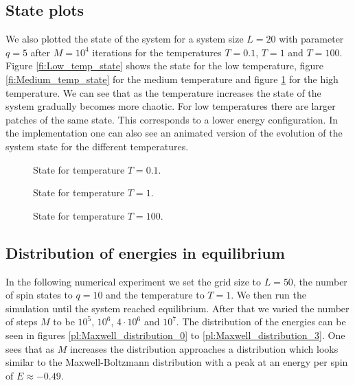 \subsection{State plots}

We also plotted the state of the system for a system size $L=20$ with parameter $q=5$ after $M=10^4$ iterations for the temperatures $T=0.1$, $T=1$ and $T=100$. Figure  \ref{fi:Low_temp_state} shows the state for the low temperature, figure  \ref{fi:Medium_temp_state} for the medium temperature and figure \ref{fi:High_temp_state} for the high temperature.
We can see that as the temperature increases the state of the system gradually becomes more chaotic. For low temperatures there are larger patches of the same state. This corresponds to a lower energy configuration. In the implementation one can also see an animated version of the evolution of the system state for the different temperatures.

\begin{figure}
\begin{minipage}{0.3\textwidth}
\centering
\graphicspath{{../../Plots/}}

\caption{State for temperature $T=0.1$.}
\label{fi:Low_temp_state}
\end{minipage}
\hfill
\begin{minipage}{0.3\textwidth}
\centering
\graphicspath{{../../Plots/}}

\caption{State for temperature $T=1$.}
\label{fi:Medium_temp_state}
\end{minipage}
\hfill
\begin{minipage}{0.3\textwidth}
\centering
\graphicspath{{../../Plots/}}

\caption{State for temperature $T=100$.}
\label{fi:High_temp_state}
\end{minipage}
\end{figure}



\subsection{Distribution of energies in equilibrium}

In the following numerical experiment we set the grid size to $L=50$, the number of spin states to $q=10$ and the temperature to $T=1$. We then run the simulation until the system reached equilibrium. After that we varied the number of steps $M$ to be $10^5$, $10^6$, $4\cdot 10^6$ and $10^7$.
The distribution of the energies can be seen in figures \ref{pl:Maxwell_distribution_0} to \ref{pl:Maxwell_distribution_3}. One sees that as $M$ increases the distribution approaches a distribution which looks similar to the Maxwell-Boltzmann distribution with a peak at an energy per spin of $E\approx-0.49$.

